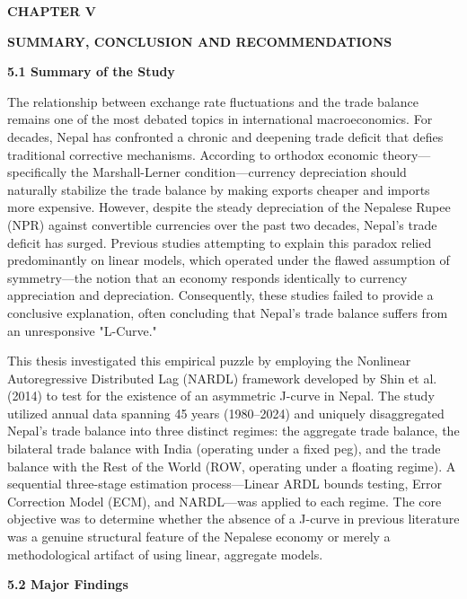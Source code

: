 \documentclass[12pt]{article}
\begin{document}
\newpage
\begin{center}
\textbf{CHAPTER V}
\end{center}
\begin{center}
\textbf{SUMMARY, CONCLUSION AND RECOMMENDATIONS}
\end{center}

\vspace{0.5cm}
\noindent\textbf{5.1 Summary of the Study}

The relationship between exchange rate fluctuations and the trade balance remains one of the most debated topics in international macroeconomics. For decades, Nepal has confronted a chronic and deepening trade deficit that defies traditional corrective mechanisms. According to orthodox economic theory—specifically the Marshall-Lerner condition—currency depreciation should naturally stabilize the trade balance by making exports cheaper and imports more expensive. However, despite the steady depreciation of the Nepalese Rupee (NPR) against convertible currencies over the past two decades, Nepal’s trade deficit has surged. Previous studies attempting to explain this paradox relied predominantly on linear models, which operated under the flawed assumption of symmetry—the notion that an economy responds identically to currency appreciation and depreciation. Consequently, these studies failed to provide a conclusive explanation, often concluding that Nepal’s trade balance suffers from an unresponsive "L-Curve."

This thesis investigated this empirical puzzle by employing the Nonlinear Autoregressive Distributed Lag (NARDL) framework developed by Shin et al. (2014) to test for the existence of an asymmetric J-curve in Nepal. The study utilized annual data spanning 45 years (1980–2024) and uniquely disaggregated Nepal’s trade balance into three distinct regimes: the aggregate trade balance, the bilateral trade balance with India (operating under a fixed peg), and the trade balance with the Rest of the World (ROW, operating under a floating regime). A sequential three-stage estimation process—Linear ARDL bounds testing, Error Correction Model (ECM), and NARDL—was applied to each regime. The core objective was to determine whether the absence of a J-curve in previous literature was a genuine structural feature of the Nepalese economy or merely a methodological artifact of using linear, aggregate models.

\vspace{0.5cm}
\noindent\textbf{5.2 Major Findings}
\end{document}
